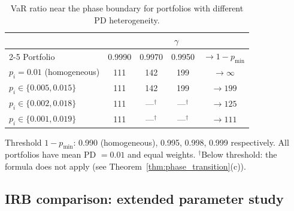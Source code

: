 \documentclass[11pt]{article}
\theoremstyle{definition}
\newcommand{\1}{\mathbf{1}}
\begin{document}
\begin{table}[h]
\centering
\caption{VaR ratio near the phase boundary for portfolios with different PD heterogeneity.}
\label{tab:phase_detailed}
\begin{tabular}{lcccc}
\toprule
& \multicolumn{4}{c}{$\gamma$} \\
\cmidrule{2-5}
Portfolio & 0.9990 & 0.9970 & 0.9950 & $\to 1 - p_{\min}$ \\
\midrule
$p_i = 0.01$ (homogeneous) & 111 & 142 & 199 & $\to \infty$ \\
$p_i \in \{0.005, 0.015\}$ & 111 & 142 & 199 & $\to 199$ \\
$p_i \in \{0.002, 0.018\}$ & 111 & ---$^{\dagger}$ & ---$^{\dagger}$ & $\to 125$ \\
$p_i \in \{0.001, 0.019\}$ & 111 & ---$^{\dagger}$ & ---$^{\dagger}$ & $\to 111$ \\
\bottomrule
\end{tabular}
\begin{flushleft}
\small Threshold $1 - p_{\min}$: 0.990 (homogeneous), 0.995, 0.998, 0.999 respectively. All portfolios have mean PD $= 0.01$ and equal weights. ${}^{\dagger}$Below threshold: the formula does not apply (see Theorem~\ref{thm:phase_transition}(c)).
\end{flushleft}
\end{table}

\subsection{IRB comparison: extended parameter study}
\end{document}
